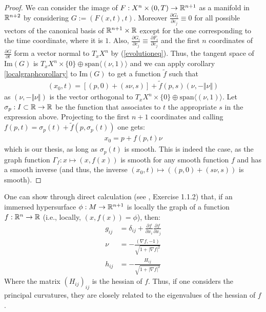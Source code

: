 \begin{proof}
	We can consider the image of $F:X^n\times(0, T)\rightarrow \mathbb{R}^{n+1}$ as a manifold in $\mathbb{R}^{n+2}$ by considering $G:=(F(x, t), t)$. Moreover $\frac{\partial G_t}{\partial e_j}\equiv 0$ for all possible vectors of the canonical basis of $\mathbb{R}^{n+1}\times \mathbb{R}$ except for the one corresponding to the time coordinate, where it is $1$. Also, $\frac{\partial G_i}{\partial e_j}\equiv \frac{\partial F_i}{\partial e_j}$ and the first $n$ coordinates of  $\frac{\partial G}{\partial t}$ form a vector normal to $T_x X^n$ by (\ref{evolutioneq}).  Thus, the tangent space of $\mathrm{Im}(G)$ is $T_x X^n \times \{0\}\oplus  \mathrm{span}\langle (\nu, 1)\rangle$ and we can apply corollary  \ref{localgraphcorollary} to $\mathrm{Im}(G)$ to get a function $\tilde{f}$ such that 
	\begin{align*}
		(x_0, t)= \left[(p, 0) +  (s\nu, s)\right] + \tilde{f}(p, s)(\nu, -\Vert \nu\Vert)
	\end{align*}
	as $(\nu, -\Vert \nu\Vert)$ is the vector orthogonal to  $T_x X^n \times \{0\}\oplus  \mathrm{span}\langle (\nu, 1)\rangle$. Let $\sigma_p:I\subset\mathbb{R}\rightarrow\mathbb{R}$ be the function that associates to $t$ the appropriate $s$ in the expression above.  Projecting to the first $n+1$ coordinates and calling $f(p, t)=\sigma_p(t)+\tilde{f}(p, \sigma_p(t))$ one gets:
	\begin{align*}
		x_0= p + f(p, t)\nu 
	\end{align*}
	which is our thesis, as long as $\sigma_p(t)$ is smooth. This is indeed the case, as the graph function $\Gamma_f:x\mapsto(x, f(x))$ is smooth for any smooth function $f$ and has a smooth inverse (and thus, the inverse $(x_0, t)\mapsto ((p, 0) +  (s\nu, s))$ is smooth).
\end{proof}
One can show through direct calculation (see \cite{mantegazza}, Exercise 1.1.2) that, if an immersed hypersurface $\phi : M\rightarrow \mathbb{R}^{n+1}$ is locally the graph of a function $f:\mathbb{R}^n \rightarrow \mathbb{R}$ (i.e., locally, $(x, f(x))=\phi$), then: 
\begin{align*}
	g_{ij}&=\delta_{ij}+ \frac{\partial f}{\partial x_i} \frac{\partial f}{\partial x_j}\\
	\nu&= -\frac{(\nabla f, -1)}{\sqrt{1+|\nabla f|^2}}\\
	h_{ij}&= -\frac{H_{ij}}{\sqrt{1+|\nabla f|^2}}
\end{align*}
Where the matrix $(H_{ij})_{ij}$ is the hessian of $f$. Thus, if one considers the principal curvatures, they are closely related to the eigenvalues of the hessian of $f$. 




